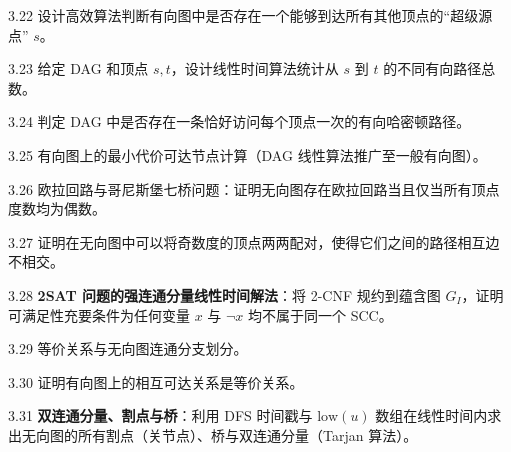 \begin{exercise}{3.22}
设计高效算法判断有向图中是否存在一个能够到达所有其他顶点的“超级源点” $s$。
\end{exercise}

\begin{exercise}{3.23}
给定 DAG 和顶点 $s, t$，设计线性时间算法统计从 $s$ 到 $t$ 的不同有向路径总数。
\end{exercise}

\begin{exercise}{3.24}
判定 DAG 中是否存在一条恰好访问每个顶点一次的有向哈密顿路径。
\end{exercise}

\begin{exercise}{3.25}
有向图上的最小代价可达节点计算（DAG 线性算法推广至一般有向图）。
\end{exercise}

\begin{exercise}{3.26}
欧拉回路与哥尼斯堡七桥问题：证明无向图存在欧拉回路当且仅当所有顶点度数均为偶数。
\end{exercise}

\begin{exercise}{3.27}
证明在无向图中可以将奇数度的顶点两两配对，使得它们之间的路径相互边不相交。
\end{exercise}

\begin{exercise}{3.28}
\textbf{2SAT 问题的强连通分量线性时间解法}：将 2-CNF 规约到蕴含图 $G_I$，证明可满足性充要条件为任何变量 $x$ 与 $\neg x$ 均不属于同一个 SCC。
\end{exercise}

\begin{exercise}{3.29}
等价关系与无向图连通分支划分。
\end{exercise}

\begin{exercise}{3.30}
证明有向图上的相互可达关系是等价关系。
\end{exercise}

\begin{exercise}{3.31}
\textbf{双连通分量、割点与桥}：利用 DFS 时间戳与 $\text{low}(u)$ 数组在线性时间内求出无向图的所有割点（关节点）、桥与双连通分量（Tarjan 算法）。
\end{exercise}

